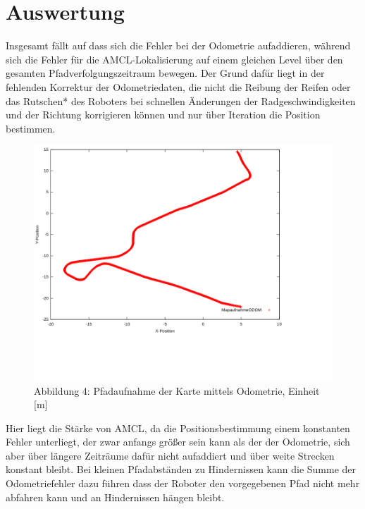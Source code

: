 \documentclass[11pt,a4paper]{article}
\begin{document}
\section{Auswertung}
Insgesamt fällt auf dass sich die Fehler bei der Odometrie aufaddieren, während sich die Fehler für die AMCL-Lokalisierung
auf einem gleichen Level über den gesamten Pfadverfolgungszeitraum bewegen. Der Grund dafür liegt in der fehlenden Korrektur der Odometriedaten, die 
nicht die Reibung der Reifen oder das Rutschen* des Roboters bei schnellen Änderungen der Radgeschwindigkeiten und der Richtung korrigieren können und nur über Iteration die Position bestimmen.
\begin{figure}[H]
    \caption*{Abbildung 4: Pfadaufnahme der Karte mittels Odometrie, Einheit [m]}
    \includegraphics[scale = 0.6]{Plots/better ones/mapaufnahmeODOM.png}
    \centering
\end{figure}
\vspace{-25mm}
Hier liegt die Stärke von AMCL, da die Positionsbestimmung einem konstanten Fehler unterliegt, der zwar anfangs größer sein kann als der der Odometrie,
sich aber über längere Zeiträume dafür nicht aufaddiert und über weite Strecken konstant bleibt. Bei kleinen Pfadabständen zu Hindernissen kann die Summe der Odometriefehler dazu führen dass 
der Roboter den vorgegebenen Pfad nicht mehr abfahren kann und an Hindernissen hängen bleibt.
\end{document}
